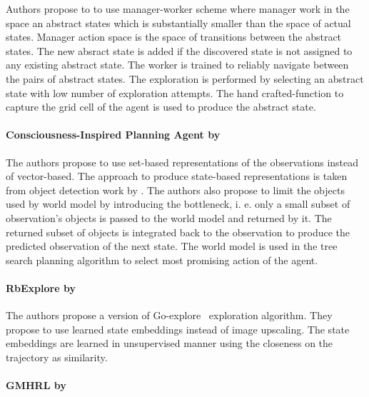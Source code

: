 \documentclass[acmsmall, nonacm]{acmart}
\begin{document}
Authors propose to to use manager-worker scheme where manager work in the space an abstract states which is substantially smaller than the space of actual states. Manager action space is the space of transitions between the abstract states. The new absract state is  added if the discovered state is not assigned to any existing abstract state. The worker is trained to reliably navigate between the pairs of abstract states. The exploration is performed by selecting an abstract state with low number of exploration attempts. The hand crafted-function to capture the grid cell of the agent is used to produce the abstract state.


\paragraph{Consciousness-Inspired Planning Agent by \citet{Zhao2021ACP}}

The authors propose to use set-based representations of the observations instead of vector-based. The approach to produce state-based representations is taken from object detection work by \citet{Carion2020EndtoEndOD}. The authors also propose to limit the objects used by world model by introducing the bottleneck, i. e. only a small subset of observation's objects is passed to the world model and returned by it. The returned subset of objects is integrated back to the observation to produce the predicted observation of the next state. The world model is used in the tree search planning algorithm to select most promising action of the agent.


\paragraph{RbExplore by \citet{Ugadiarov2021LongTermEI}}

The authors propose a version of Go-explore~\citep{ecoffet_first_2021} exploration algorithm. They propose to use learned state embeddings instead of image upscaling. The state embeddings are learned in unsupervised manner using the closeness on the trajectory as similarity.


\paragraph{GMHRL by \citet{chen2019learning}}
\end{document}
